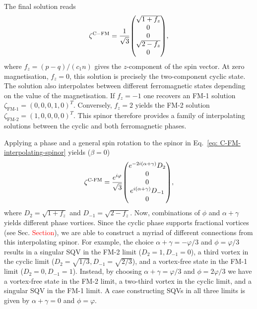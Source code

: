 The final solution reads
\begin{equation}\label{eq: C-FM-interpolating-spinor}
    \zeta^\mathrm{C-FM} = \frac{1}{\sqrt{3}}\mqty(
    \sqrt{1 + f_z} \\
    0 \\
    0 \\
    \sqrt{2 - f_z} \\
    0
    ),
\end{equation}
where \(f_z = (p - q) / (c_1n)\) gives the \(z\)-component of the spin vector.
At zero magnetisation, \(f_z = 0\), this solution is precisely the two-component
cyclic state.
The solution also interpolates between different ferromagnetic states depending
on the value of the magnetisation.
If \(f_z = -1\) one recovers an FM-1 solution
\(\zeta_\text{FM-1} = {(0, 0, 0, 1, 0)}^T\).
Conversely, \(f_z = 2\) yields the FM-2 solution
\(\zeta_\text{FM-2} = {(1, 0, 0, 0, 0)}^T\).
This spinor therefore provides a family of interpolating solutions between the
cyclic and both ferromagnetic phases.

Applying a phase and a general spin rotation to the spinor in
Eq.~\eqref{eq: C-FM-interpolating-spinor} yields (\(\beta = 0\))
\begin{equation}\label{eq: C-FM-general-spinor}
    \zeta^\text{C-FM} = \frac{e^{i\varphi}}{\sqrt{3}}\mqty(
    e^{-2i(\alpha+\gamma)}D_2 \\
    0 \\
    0 \\
    e^{i(\alpha+\gamma)}D_{-1} \\
    0
    ),
\end{equation}
where \(D_2 = \sqrt{1 + f_z}\) and
\(D_{-1} = \sqrt{2 - f_z}\).
Now, combinations of \(\phi \) and \(\alpha+\gamma \) yields different phase
vortices.
Since the cyclic phase supports fractional vortices
(see Sec. \textcolor{red}{Section}), we are able to construct a myriad of
different connections from this interpolating spinor.
For example, the choice \(\alpha+\gamma=-\varphi/3\) and \(\phi=\varphi/3\)
results in a singular SQV in the FM-2 limit (\(D_2 = 1, D_{-1} = 0\)),
a third vortex in the cyclic limit (\(D_2 = \sqrt{1/3}, D_{-1} = \sqrt{2/3}\)),
and a vortex-free state in the FM-1 limit (\(D_2 = 0, D_{-1} = 1\)).
Instead, by choosing \(\alpha + \gamma = \varphi/3\) and \(\phi = 2\varphi/3\)
we have a vortex-free state in the FM-2 limit, a two-third vortex in the cyclic
limit, and a singular SQV in the FM-1 limit.
A case constructing SQVs in all three limits is given by \(\alpha+\gamma = 0\)
and \(\phi = \varphi \).

